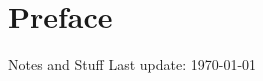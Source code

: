 \documentclass[10pt,oneside,openany]{memoir}
\begin{document}
\chapter*{Preface}
\vspace{-35pt}
Notes and Stuff
\vspace{-35pt}
\tableofcontents
\vfill
\specialdate
Last update: \today

%



\end{document}
